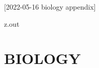 [2022-05-16 biology appendix]

\begin{VerbatimOut}{z.out}
\chapter{BIOLOGY}

\end{VerbatimOut}

\MyIO
